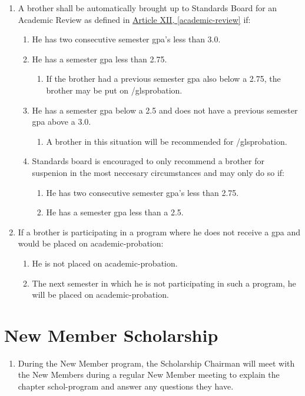 \begin{enumerate}
\begin{enumerate}
\begin{enumerate}
				\item A brother shall be automatically brought up to Standards Board for an Academic Review as defined in \hyperref[academic-review]{Article XII, \autoref*{academic-review}} if:
				\begin{enumerate}
					\item He has two consecutive semester \gls{gpa}'s less than 3.0.
					\item He has a semester \gls{gpa} less than 2.75.
					\begin{enumerate}
						\item If the brother had a previous semester \gls{gpa} also below a 2.75, the brother may be put on /gls{probation}.
					\end{enumerate}
					\item He has a semester \gls{gpa} below a 2.5 and does not have a previous semester \gls{gpa} above a 3.0.
					\begin{enumerate}
						\item A brother in this situation will be recommended for /gls{probation}.
					\end{enumerate}
					\item Standards board is encouraged to only recommend a brother for suspenion in the most neccesary circumstances and may only do so if: 
					\begin{enumerate}
						\item He has two consecutive semester \gls{gpa}'s less than 2.75.
						\item He has a semester \gls{gpa} less than a 2.5.
				\end{enumerate}
			\end{enumerate}

		\item If a brother is participating in a program where he does not receive a \gls{gpa} and would be placed on \gls{academic-probation}:
			\begin{enumerate}
				\item He is not placed on \gls{academic-probation}.
				\item The next semester in which he is not participating in such a program, he will be placed on \gls{academic-probation}.
			\end{enumerate}

		\end{enumerate}
	\end{enumerate}


\section{New Member Scholarship}
	\begin{enumerate}
		\item During the New Member program, the Scholarship Chairman will meet with the New Members during a regular New Member meeting to explain the chapter \Gls{schol-program} and answer any questions they have.
		

\end{enumerate}
\end{enumerate}
